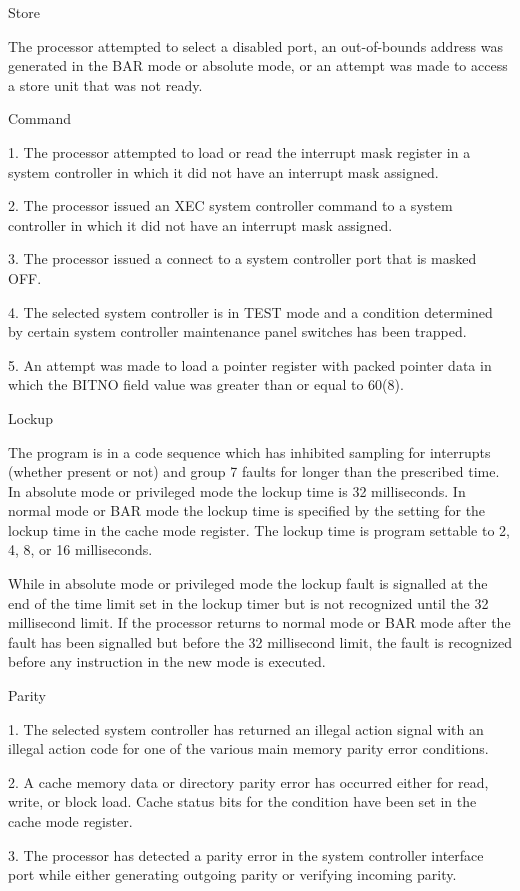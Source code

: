 Store

The processor attempted to select a disabled port, an out-of-bounds address was
generated in the BAR mode or absolute mode, or an attempt was made to access a
store unit that was not ready.

Command

1. The processor attempted to load or read the interrupt mask register in a
system controller in which it did not have an interrupt mask assigned.

2. The processor issued an XEC system controller command to a system controller
in which it did not have an interrupt mask assigned.  

3. The processor issued a connect to a system controller port that is masked
OFF.  

4. The selected system controller is in TEST mode and a condition determined by
certain system controller maintenance panel switches has been trapped.

5. An attempt was made to load a pointer register with packed pointer data in
which the BITNO field value was greater than or equal to 60(8).

Lockup

The program is in a code sequence which has inhibited sampling for interrupts
(whether present or not) and group 7 faults for longer than the prescribed
time. In absolute mode or privileged mode the lockup time is 32 milliseconds.
In normal mode or BAR mode the lockup time is specified by the setting for the
lockup time in the cache mode register. The lockup time is program settable to
2, 4, 8, or 16 milliseconds.  

While in absolute mode or privileged mode the lockup fault is signalled at the
end of the time limit set in the lockup timer but is not recognized until the
32 millisecond limit. If the processor returns to normal mode or BAR mode after
the fault has been signalled but before the 32 millisecond limit, the fault is
recognized before any instruction in the new mode is executed.

Parity

1. The selected system controller has returned an illegal action signal with an
illegal action code for one of the various main memory parity error conditions.

2. A cache memory data or directory parity error has occurred either for read,
write, or block load. Cache status bits for the condition have been set in the
cache mode register.

3. The processor has detected a parity error in the system controller interface
port while either generating outgoing parity or verifying incoming parity.  


